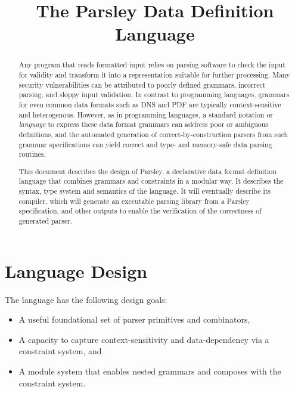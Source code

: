 \documentclass[letterpaper]{article}
\title{The Parsley Data Definition Language}
\begin{document}
\maketitle

\begin{abstract}
  Any program that reads formatted input relies on parsing software to
  check the input for validity and transform it into a representation
  suitable for further processing.  Many security vulnerabilities can
  be attributed to poorly defined grammars, incorrect parsing, and
  sloppy input validation.  In contrast to programming languages,
  grammars for even common data formats such as DNS and PDF are
  typically context-sensitive and heterogenous.  However, as in
  programming languages, a standard notation or {\em language} to
  express these data format grammars can address poor or ambiguous
  definitions, and the automated generation of correct-by-construction
  parsers from such grammar specifications can yield correct and type-
  and memory-safe data parsing routines.

  This document describes the design of Parsley, a declarative data
  format definition language that combines grammars and constraints in
  a modular way.  It describes the syntax, type system and semantics
  of the language.  It will eventually describe its compiler, which
  will generate an executable parsing library from a Parsley
  specification, and other outputs to enable the verification of the
  correctness of generated parser.
\end{abstract}

\section{Language Design}

The language has the following design goals:

\begin{itemize}
\item A useful foundational set of parser primitives and combinators,
\item A capacity to capture context-sensitivity and data-dependency
  via a constraint system, and
\item  A module system that enables nested grammars and composes with
  the constraint system.
\end{itemize}
\end{document}
